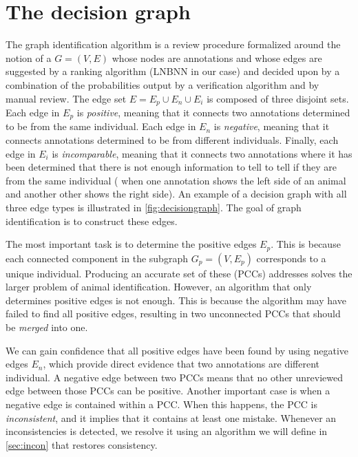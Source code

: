 \section{The decision graph}\label{sec:decisiongraph}

\decisiongraph{}

The graph identification algorithm is a review procedure formalized around the notion of a  $G = (V, E)$ whose nodes are annotations and whose edges are suggested by a ranking algorithm (LNBNN in our
case) and decided upon by a combination of the probabilities output by a verification algorithm and by manual
review.  The edge set $E = E_p \cup E_n \cup E_i$ is composed of three disjoint sets. Each edge in $E_p$ is
\emph{positive}, meaning that it connects two annotations determined to be from the same individual. Each edge in
$E_n$ is \emph{negative}, meaning that it connects annotations determined to be from different individuals.
Finally, each edge in $E_i$ is \emph{incomparable}, meaning that it connects two annotations where it has been
determined that there is not enough information to tell to tell if they are from the same individual (\eg{} when
one annotation shows the left side of an animal and another other shows the right side).  An example of a decision
graph with all three edge types is illustrated in \cref{fig:decisiongraph}. The goal of graph identification is to
construct these edges.

The most important task is to determine the positive edges $E_p$.  This is because each connected component in the
subgraph $G_p = (V, E_p)$ corresponds to a unique individual.  Producing an accurate set of these
 (PCCs) addresses solves the larger problem of animal identification.
However, an algorithm that only determines positive edges is not enough.  This is because the algorithm may have
failed to find all positive edges, resulting in two unconnected PCCs that should be \emph{merged} into one.

We can gain confidence that all positive edges have been found by using negative edges $E_n$, which provide direct
evidence that two annotations are different individual.  A negative edge between two PCCs means that no other
unreviewed edge between those PCCs can be positive.  Another important case is when a negative edge is contained
within a PCC. When this happens, the PCC is \emph{inconsistent}, and it implies that it contains at least one
mistake. Whenever an inconsistencies is detected, we resolve it using an algorithm we will define in
\cref{sec:incon} that restores consistency.

